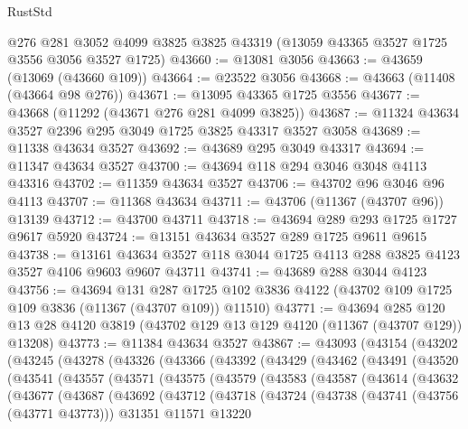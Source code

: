 \begin{lexlean}{RustStd}
\begin{coremodule}
    @276
    @281
    @3052
    @4099
    @3825
    @3825
    @43319
    (@13059 @43365 @3527 @1725 @3556 @3056 @3527 @1725)
@43660 := @13081 @3056
@43663 := @43659 (@13069 (@43660 @109))
@43664 := @23522 @3056
@43668 := @43663 (@11408 (@43664 @98 @276))
@43671 := @13095 @43365 @1725 @3556
@43677 := @43668 (@11292 (@43671 @276 @281 @4099 @3825))
@43687 := @11324 @43634 @3527 @2396 @295 @3049 @1725 @3825 @43317 @3527 @3058
@43689 := @11338 @43634 @3527
@43692 := @43689 @295 @3049 @43317
@43694 := @11347 @43634 @3527
@43700 := @43694 @118 @294 @3046 @3048 @4113 @43316
@43702 := @11359 @43634 @3527
@43706 := @43702 @96 @3046 @96 @4113
@43707 := @11368 @43634
@43711 := @43706 (@11367 (@43707 @96)) @13139
@43712 := @43700 @43711
@43718 := @43694 @289 @293 @1725 @1727 @9617 @5920
@43724 := @13151 @43634 @3527 @289 @1725 @9611 @9615
@43738 := @13161 @43634 @3527 @118 @3044 @1725 @4113 @288 @3825 @4123 @3527 @4106 @9603 @9607 @43711
@43741 := @43689 @288 @3044 @4123
@43756 := @43694
    @131
    @287
    @1725
    @102
    @3836
    @4122
    (@43702 @109 @1725 @109 @3836 (@11367 (@43707 @109)) @11510)
@43771 := @43694
    @285
    @120
    @13
    @28
    @4120
    @3819
    (@43702 @129 @13 @129 @4120 (@11367 (@43707 @129)) @13208)
@43773 := @11384 @43634 @3527
@43867 := @43093
    (@43154
      (@43202
        (@43245
          (@43278
            (@43326
              (@43366
                (@43392
                  (@43429
                    (@43462
                      (@43491
                        (@43520
                          (@43541
                            (@43557
                              (@43571
                                (@43575
                                  (@43579
                                    (@43583
                                      (@43587
                                        (@43614
                                          (@43632
                                            (@43677
                                              (@43687
                                                (@43692
                                                  (@43712
                                                    (@43718
                                                      (@43724
                                                        (@43738
                                                          (@43741 (@43756 (@43771 @43773)))
                                                          @31351
                                                          @11571
                                                          @13220

\end{coremodule}
\end{lexlean}
